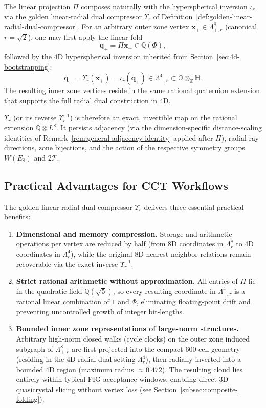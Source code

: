 \documentclass{article}
\begin{document}
The linear projection \(\Pi\) composes naturally with the hyperspherical inversion \(\iota_r\) via the golden linear-radial dual compressor \(\Upsilon_r\) of Definition~\ref{def:golden-linear-radial-dual-compressor}. For an arbitrary outer zone vertex \(\mathbf{x}_+ \in \Lambda_{+,r}^8\) (canonical \(r = \sqrt{2}\)), one may first apply the linear fold
\[
\mathbf{q}_+ = \Pi\mathbf{x}_+ \in \mathbb{Q}(\Phi),
\]
followed by the \(4\)D hyperspherical inversion inherited from Section~\ref{sec:4d-bootstrapping}:
\[
\mathbf{q}_- = \Upsilon_r(\mathbf{x}_+) = \iota_r(\mathbf{q}_+) \in \Lambda_{-,r}^4 \subset \mathbb{Q}\otimes_{\mathbb{Z}}\mathbb{H}.
\]
The resulting inner zone vertices reside in the same rational quaternion extension that supports the full radial dual construction in \(4\)D.

\(\Upsilon_r\) (or its reverse \(\Upsilon_r^{-1}\)) is therefore an exact, invertible map on the rational extension \(\mathbb{Q}\otimes L^8\). It persists adjacency (via the dimension-specific distance-scaling identities of Remark~\ref{rem:general-adjacency-identity} applied after \(\Pi\)), radial-ray directions, zone bijections, and the action of the respective symmetry groups \(W(E_8)\) and \(2\mathcal{T}\).

\subsection{Practical Advantages for CCT Workflows}
\label{sec:h4-folding:cct-workflows}

The golden linear-radial dual compressor \(\Upsilon_r\) delivers three essential practical benefits:
\begin{enumerate}
\item \textbf{Dimensional and memory compression.} Storage and arithmetic operations per vertex are reduced by half (from \(8\)D coordinates in \(\Lambda_r^8\) to \(4\)D coordinates in \(\Lambda_r^4\)), while the original \(8\)D nearest-neighbor relations remain recoverable via the exact inverse \(\Upsilon_r^{-1}\).
\item \textbf{Strict rational arithmetic without approximation.} All entries of \(\Pi\) lie in the quadratic field \(\mathbb{Q}(\sqrt{5})\), so every resulting coordinate in \(\Lambda_{-,r}^4\) is a rational linear combination of \(1\) and \(\Phi\), eliminating floating-point drift and preventing uncontrolled growth of integer bit-lengths.
\item \textbf{Bounded inner zone representations of large-norm structures.} Arbitrary high-norm closed walks (cycle clocks) on the outer zone induced subgraph of \(\Lambda_{+,r}^8\) are first projected into the compact \(600\)-cell geometry (residing in the 4D radial dual setting \(\Lambda_r^4\)), then radially inverted into a bounded 4D region (maximum radius \(\approx 0.472\)). The resulting cloud lies entirely within typical FIG acceptance windows, enabling direct 3D quasicrystal slicing without vertex loss (see Section~\ref{subsec:composite-folding}).
\end{enumerate}
\end{document}
